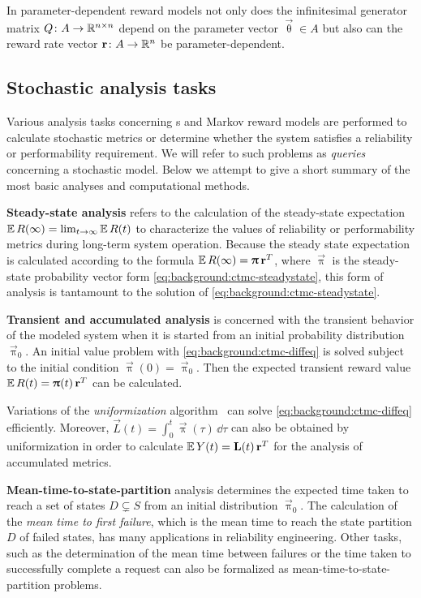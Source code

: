 In parameter-dependent reward models not only does the infinitesimal generator matrix \(Q\colon A \to \mathbb{R}^{n \times n}\) depend on the parameter vector \(\vec{\uptheta} \in A\) but also can the reward rate vector \(\bm{\mathrm{r}}\colon A \to \mathbb{R}^n\) be parameter-dependent.

\subsection{Stochastic analysis tasks}
\label{ssec:background:analysis}

Various analysis tasks concerning s and Markov reward models are performed to calculate stochastic metrics or determine whether the system satisfies a reliability or performability requirement. We will refer to such problems as \emph{queries} concerning a stochastic model. Below we attempt to give a short summary of the most basic analyses and computational methods.

\newpara \textbf{Steady-state analysis} refers to the calculation of the steady-state expectation \(\operatorname{\mathbb{E}} R(\infty) = \lim_{t \to \infty} \operatorname{\mathbb{E}} R(t)\) to characterize the values of reliability or performability metrics during long-term system operation. Because the steady state expectation is calculated according to the formula \(\operatorname{\mathbb{E}} R(\infty) = \bm{\mathrm{\uppi}} \, \bm{\mathrm{r}}^T\), where \(\vec{\uppi}\) is the steady-state probability vector form \vref{eq:background:ctmc-steadystate}, this form of analysis is tantamount to the solution of \cref{eq:background:ctmc-steadystate}.

\newpara \textbf{Transient and accumulated analysis} is concerned with the transient behavior of the modeled system when it is started from an initial probability distribution \(\vec{\uppi}_0\). An initial value problem with \vref{eq:background:ctmc-diffeq} is solved subject to the initial condition \(\vec{\uppi}(0) = \vec{\uppi}_0\). Then the expected transient reward value \(\operatorname{\mathbb{E}} R(t) = \bm{\mathrm{\uppi}}(t) \, \bm{\mathrm{r}}^T\) can be calculated.

Variations of the \emph{uniformization} algorithm~ can solve \cref{eq:background:ctmc-diffeq} efficiently. Moreover, \(\vec{L}(t) = \int_{0}^{t} \vec{\uppi}(\tau) \,\dd\tau\) can also be obtained by uniformization in order to calculate \(\operatorname{\mathbb{E}} Y(t) = \bm{\mathrm{L}}(t) \, \bm{\mathrm{r}}^T\) for the analysis of accumulated metrics.

\newpara \textbf{Mean-time-to-state-partition} analysis determines the expected time taken to reach a set of states \(D \subsetneq S\) from an initial distribution \(\vec{\uppi}_0\). The calculation of the \emph{mean time to first failure}, which is the mean time to reach the state partition \(D\) of failed states, has many applications in reliability engineering. Other tasks, such as the determination of the mean time between failures or the time taken to successfully complete a request can also be formalized as mean-time-to-state-partition problems.

